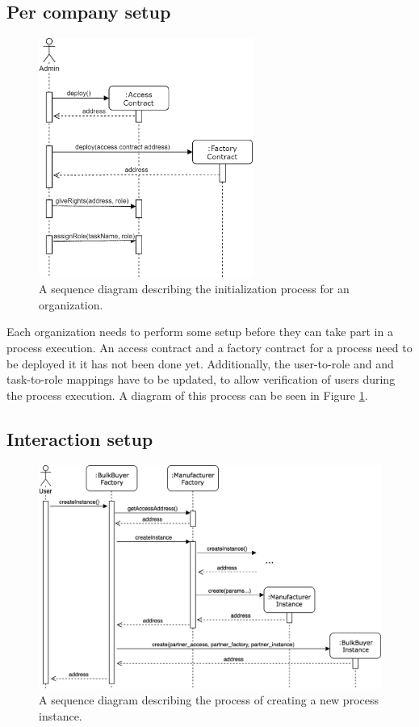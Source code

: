 \documentclass[runningheads]{llncs}
\begin{document}
\subsection{Per company setup}
\begin{figure}
	\centering
	\includegraphics[width=70mm]{fig/initialization.eps}
	\caption{A sequence diagram describing the initialization process for an organization.} 
	\label{fig:initialization}
\end{figure}

Each organization needs to perform some setup before they can take part in a process execution.
An access contract and a factory contract for a process need to be deployed it it has not been done yet.
Additionally, the user-to-role and and task-to-role mappings have to be updated, to allow verification of users during the process execution.
A diagram of this process can be seen in Figure \ref{fig:initialization}.

\subsection{Interaction setup}
\begin{figure}
	\centering
	\includegraphics[width=\textwidth]{fig/instance_creation.eps}
	\caption{A sequence diagram describing the process of creating a new process instance.} 
	\label{fig:instance_creation}
\end{figure}
\end{document}
